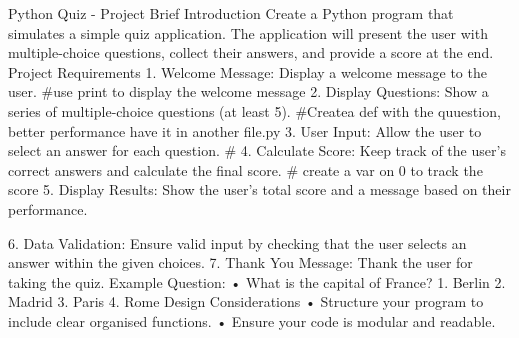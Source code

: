 Python Quiz - Project Brief
Introduction
Create a Python program that simulates a simple quiz application. The application will present the 
user with multiple-choice questions, collect their answers, and provide a score at the end.
Project Requirements
1. Welcome Message: Display a welcome message to the user.
#use print to display the welcome message
2. Display Questions: Show a series of multiple-choice questions (at least 5).
#Createa def with the quuestion, better performance have it in another file.py
3. User Input: Allow the user to select an answer for each question.
#
4. Calculate Score: Keep track of the user's correct answers and calculate the final score.
# create a var on 0 to track the score 
5. Display Results: Show the user's total score and a message based on their performance.

6. Data Validation: Ensure valid input by checking that the user selects an answer within the 
given choices.
7. Thank You Message: Thank the user for taking the quiz.
Example Question:
• What is the capital of France?
1. Berlin
2. Madrid
3. Paris
4. Rome
Design Considerations
• Structure your program to include clear organised functions.
• Ensure your code is modular and readable.